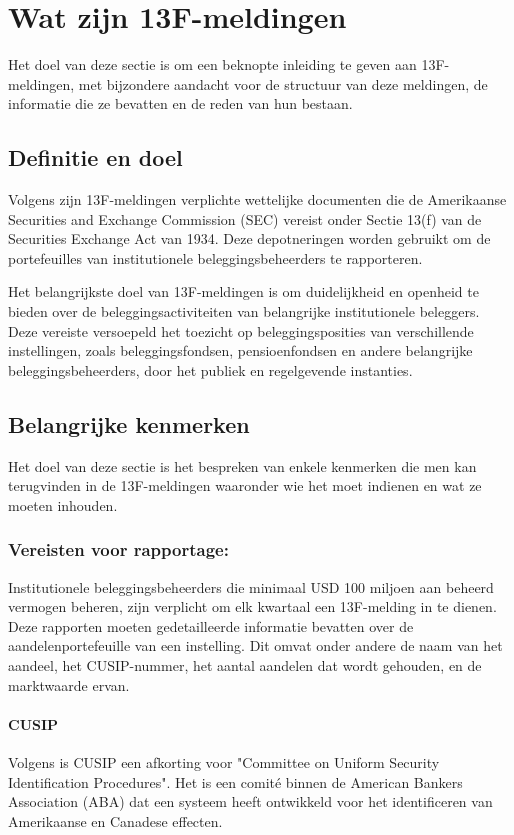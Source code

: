 \section{Wat zijn 13F-meldingen}

Het doel van deze sectie is om een beknopte inleiding te geven aan 13F-meldingen, met bijzondere aandacht voor de structuur van deze meldingen, de informatie die ze bevatten en de reden van hun bestaan.


\subsection{Definitie en doel}
Volgens \autocite{SECform13F2024} zijn 13F-meldingen verplichte wettelijke documenten die de Amerikaanse Securities and Exchange Commission (SEC) vereist onder Sectie 13(f) van de Securities Exchange Act van 1934. Deze depotneringen worden gebruikt om de portefeuilles van institutionele beleggingsbeheerders te rapporteren.

Het belangrijkste doel van 13F-meldingen is om duidelijkheid en openheid te bieden over de beleggingsactiviteiten van belangrijke institutionele beleggers. Deze vereiste versoepeld het toezicht op beleggingsposities van verschillende instellingen, zoals beleggingsfondsen, pensioenfondsen en andere belangrijke beleggingsbeheerders, door het publiek en regelgevende instanties.

\subsection{Belangrijke kenmerken}
Het doel van deze sectie is het bespreken van enkele kenmerken die men kan terugvinden in de 13F-meldingen waaronder wie het moet indienen en wat ze moeten inhouden.


\subsubsection{Vereisten voor rapportage:}

Institutionele beleggingsbeheerders die minimaal USD 100 miljoen aan beheerd vermogen beheren, zijn verplicht om elk kwartaal een 13F-melding in te dienen. Deze rapporten moeten gedetailleerde informatie bevatten over de aandelenportefeuille van een instelling. Dit omvat onder andere de naam van het aandeel, het CUSIP-nummer, het aantal aandelen dat wordt gehouden, en de marktwaarde ervan. 
\paragraph{CUSIP}
Volgens \autocite{Hayes_2024} is CUSIP een afkorting voor "Committee on Uniform Security Identification Procedures". Het is een comité binnen de American Bankers Association (ABA) dat een systeem heeft ontwikkeld voor het identificeren van Amerikaanse en Canadese effecten.

